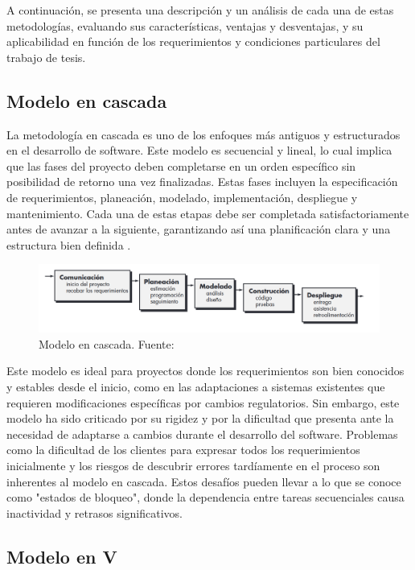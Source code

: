 A continuación, se presenta una descripción y un análisis de cada una de estas metodologías, evaluando sus características, ventajas y desventajas, y su aplicabilidad en función de los requerimientos y condiciones particulares del trabajo de tesis.


\subsection{Modelo en cascada}

La metodología en cascada es uno de los enfoques más antiguos y estructurados en el desarrollo de software. Este modelo es secuencial y lineal, lo cual implica que las fases del proyecto deben completarse en un orden específico sin posibilidad de retorno una vez finalizadas. Estas fases incluyen la especificación de requerimientos, planeación, modelado, implementación, despliegue y mantenimiento. Cada una de estas etapas debe ser completada satisfactoriamente antes de avanzar a la siguiente, garantizando así una planificación clara y una estructura bien definida \cite{pressman2010ingeneria}.

\begin{figure}[h]
    \centering
    \includegraphics[width=\linewidth]{Figures/model-waterfall.png}
    \caption{Modelo en cascada. Fuente: \cite{pressman2010ingeneria}}
\end{figure}


Este modelo es ideal para proyectos donde los requerimientos son bien conocidos y estables desde el inicio, como en las adaptaciones a sistemas existentes que requieren modificaciones específicas por cambios regulatorios. Sin embargo, este modelo ha sido criticado por su rigidez y por la dificultad que presenta ante la necesidad de adaptarse a cambios durante el desarrollo del software. Problemas como la dificultad de los clientes para expresar todos los requerimientos inicialmente y los riesgos de descubrir errores tardíamente en el proceso son inherentes al modelo en cascada. Estos desafíos pueden llevar a lo que se conoce como "estados de bloqueo", donde la dependencia entre tareas secuenciales causa inactividad y retrasos significativos.

\subsection{Modelo en V}

